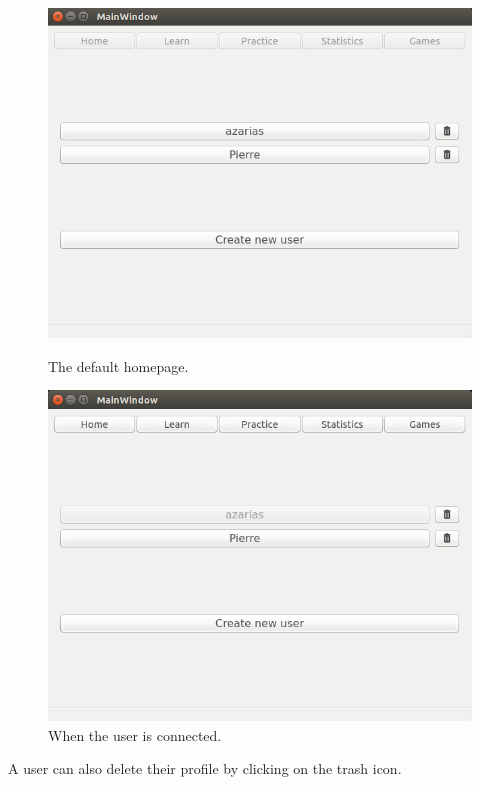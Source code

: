 \begin{figure}[H]
  \centering
  \begin{minipage}[b]{0.45\textwidth}
    \includegraphics[width=\textwidth]{images/homepage_logout.png}
    \caption{The default homepage.}
    \label{homepage-logout}
  \end{minipage}
  \hfill
  \begin{minipage}[b]{0.45\textwidth}
    \includegraphics[width=\textwidth]{images/homepage_login.png}
    \caption{When the user is connected.}
    \label{homepage-login}
  \end{minipage}
\end{figure}
A user can also delete their profile by clicking on the trash icon. \\
